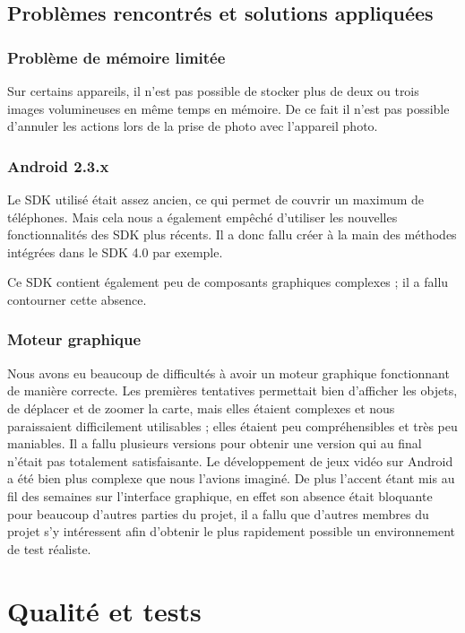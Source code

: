 \documentclass{report}
\begin{document}
\subsection{Problèmes rencontrés et solutions appliquées}

\subsubsection{Problème de mémoire limitée}

Sur certains appareils, il n’est pas possible de stocker plus de deux ou trois images volumineuses en même temps en mémoire. De ce fait il n’est pas possible d’annuler les actions lors de la prise de photo avec l’appareil photo.

\subsubsection{Android 2.3.x}

Le SDK utilisé était assez ancien, ce qui permet de couvrir un maximum de téléphones. Mais cela nous a également empêché d’utiliser les nouvelles  fonctionnalités des SDK plus récents. Il a donc fallu créer à la main des méthodes intégrées dans le SDK 4.0 par exemple.

Ce SDK contient également peu de composants graphiques complexes ; il a fallu contourner cette absence.

\subsubsection{Moteur graphique}

Nous avons eu beaucoup de difficultés à avoir un moteur graphique fonctionnant de manière correcte. Les premières tentatives permettait bien d’afficher les objets, de déplacer et de zoomer la carte, mais elles étaient complexes et nous paraissaient difficilement utilisables ; elles étaient peu compréhensibles et très peu maniables. Il a fallu plusieurs versions pour obtenir une version qui au final n’était pas totalement satisfaisante. Le développement de jeux vidéo sur Android a été bien plus complexe que nous l’avions imaginé. De plus l’accent étant mis au fil des semaines sur l’interface graphique, en effet son absence était bloquante pour beaucoup d’autres parties du projet, il a fallu que d’autres membres du projet s’y intéressent afin d’obtenir le plus rapidement possible un environnement de test réaliste.

\section{Qualité et tests}
\end{document}
